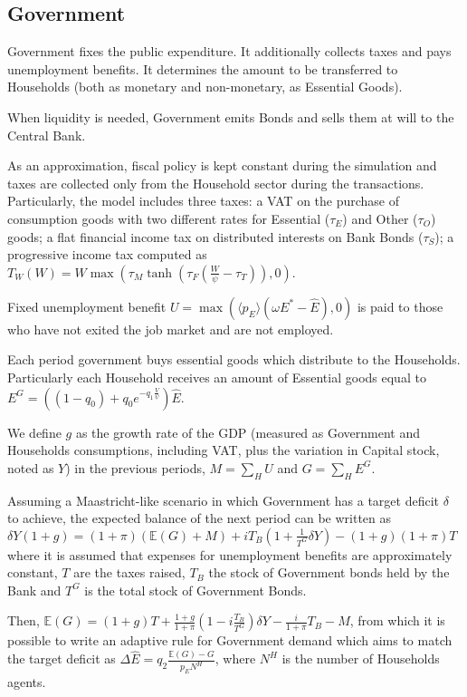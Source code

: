 \documentclass[a4paper, headings=standardclasses]{scrartcl}
\begin{document}
\subsection{Government}
Government fixes the public expenditure. It additionally collects taxes and pays unemployment benefits. It determines the amount to be transferred to Households (both as monetary and non-monetary, as Essential Goods).

When liquidity is needed, Government emits Bonds and sells them at will to the Central Bank.

As an approximation, fiscal policy is kept constant during the simulation and taxes are collected only from the Household sector during the transactions. Particularly, the model includes three taxes: a VAT on the purchase of consumption goods with two different rates for Essential ($\tau_E$) and Other ($\tau_O$) goods; a flat financial income tax on distributed interests on Bank Bonds ($\tau_S$); a progressive income tax computed as $T_W(W) = W \max(\tau_M \tanh(\tau_F (\frac{W}{\psi} - \tau_T)),0)$.

Fixed unemployment benefit $U = \max(\langle p_E \rangle (\omega E^* - \hat{E}),0)$ is paid to those who have not exited the job market and are not employed.

Each period government buys essential goods which distribute to the Households. Particularly each Household receives an amount of Essential goods equal to $E^G = ((1 - q_0) + q_0 e^{-q_1\frac{V}{\psi}})\hat{E}$.

We define $g$ as the growth rate of the GDP (measured as Government and Households consumptions, including VAT, plus the variation in Capital stock, noted as $Y$) in the previous periods, $M = \sum_H U$ and $G = \sum_H E^G$.

Assuming a Maastricht-like scenario in which Government has a target deficit $\delta$ to achieve, the expected balance of the next period can be written as $\delta Y (1+g) = (1+\pi) (\mathbb{E}(G) + M) + i T_B(1 + \frac{1}{T^G} \delta Y) - (1+g)(1+\pi) T$ where it is assumed that expenses for unemployment benefits are approximately constant, $T$ are the taxes raised, $T_B$ the stock of Government bonds held by the Bank and $T^G$ is the total stock of Government Bonds.

Then, $\mathbb{E}(G) = (1+g) T + \frac{1+g}{1+\pi}(1-i\frac{T_B}{T^G})\delta Y - \frac{i}{1+\pi}T_B - M$, from which it is possible to write an adaptive rule for Government demand which aims to match the target deficit as $\Delta \hat{E} = q_2 \frac{\mathbb{E}(G)-G}{p_E N^H}$, where $N^H$ is the number of Households agents.
\end{document}
